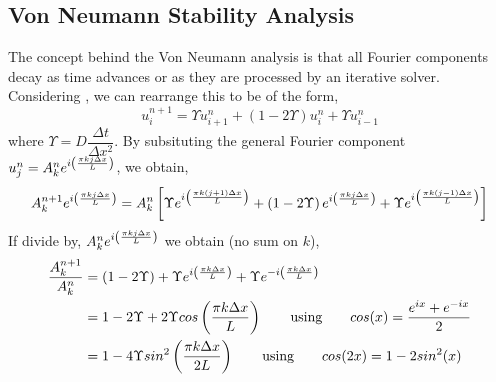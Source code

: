 \subsection{Von Neumann Stability Analysis}

The concept behind the Von Neumann analysis is that all Fourier
components decay as time advances or as they are processed by an iterative
solver. Considering , we can rearrange this to be of the
form,
\begin{equation}
  u_i^{n+1} = \Upsilon u_{i+1}^n  + (1-2\Upsilon)u_i^n + \Upsilon u_{i-1}^n
\end{equation}
where $\Upsilon=D\dfrac{\Delta t}{\Delta x^2}$. By subsituting the general Fourier
component $u_j^n = A_k^n e^{i \left( \frac{\pi kj\Delta x}{L} \right)}$, we obtain,
\begin{equation}
  A_k^{n+1}e^{i \left( \frac{\pi kj \Delta x}{L} \right)} = 
  A_k^n \left[ \Upsilon e^{i \left( \frac{\pi k(j+1)\Delta x}{L} \right)}
   + \left( 1-2\Upsilon \right) e^{i \left( \frac{\pi kj\Delta x}{L} \right)}
    + \Upsilon e^{i \left( \frac{\pi k(j-1) \Delta x}{L} \right)}  \right]
  \label{eqn:genfourier}
\end{equation}
If divide  by, 
$A_k^n e^{i \left( \frac{\pi kj \Delta x}{L} \right)}$ we obtain (no sum on $k$),
\begin{equation}
\begin{split}
 \dfrac{A_k^{n+1}}{A_k^n} 
   &= \left( 1-2\Upsilon \right) + \Upsilon e^{i \left( \frac{\pi k \Delta x}{L} \right)} 
      + \Upsilon e^{-i \left( \frac{\pi k \Delta x}{L} \right)} \\
   &= 1-2\Upsilon + 2\Upsilon cos\left( \frac{\pi k \Delta x}{L} \right) \qquad
   \text{using} \qquad cos(x)=\frac{e^{ix}+e^{-ix}}{2} \\
   &= 1- 4\Upsilon sin^2\left( \frac{\pi k \Delta x}{2L} \right) \qquad
   \text{using} \qquad cos (2x) = 1 - 2 sin^{2} (x)
\end{split}
\label{eqn:stability}
\end{equation}

